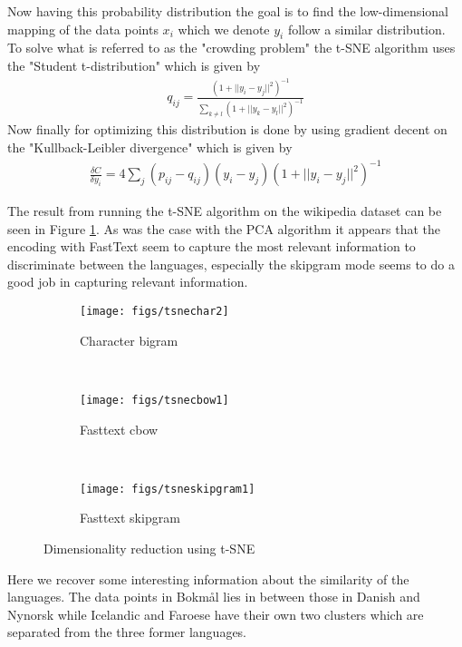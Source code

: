 Now having this probability distribution the goal is to find the low-dimensional mapping of the data points $x_i$ which we denote $y_i$ follow a similar distribution. To solve what is referred to as the "crowding problem" the t-SNE algorithm uses the "Student t-distribution" which is given by
\begin{align}
q_{ij}= \frac{ (1+|| y_i - y_j ||^2 )^{-1}}{\sum_{k\neq l} (1+|| y_k - y_l ||^2 )^{-1}}
\end{align}
Now finally for optimizing this distribution is done by using gradient decent on the "Kullback-Leibler divergence" which is given by
\begin{align}
\frac{\delta C}{\delta y_i}= 4 \sum_j (p_{ij} - q_{ij})(y_i-y_j)(1+ || y_i - y_j ||^2  )^{-1}
\end{align}

The result from running the t-SNE algorithm on the wikipedia dataset can be seen in Figure \ref{tsne}. As was the case with the PCA algorithm it appears that the encoding with FastText seem to capture the most relevant information to discriminate between the languages, especially the skipgram mode seems to do a good job in capturing relevant information.\\

\begin{figure}[h!]
    \centering
    \begin{subfigure}[b]{0.47\textwidth}
        \texttt{[image: figs/tsnechar2]}
        \caption{Character bigram}
    \end{subfigure}
    ~
    \begin{subfigure}[b]{0.47\textwidth}
        \texttt{[image: figs/tsnecbow1]}
        \caption{Fasttext cbow}
    \end{subfigure}
    ~
    \begin{subfigure}[b]{0.47\textwidth}
        \texttt{[image: figs/tsneskipgram1]}
        \caption{Fasttext skipgram}
    \end{subfigure}
    \caption{Dimensionality reduction using t-SNE}
    \label{tsne}
\end{figure}


Here we recover some interesting information about the similarity of the languages. The data points in Bokmål lies in between those in Danish and Nynorsk while Icelandic and Faroese have their own two clusters which are separated from the three former languages. \\

